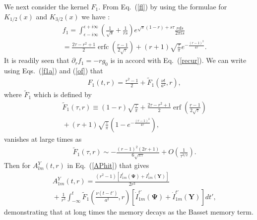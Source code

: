 \documentclass[aps,prx,twocolumn,amsmath,amssymb,amsfonts]{revtex4-2}
\DeclareMathOperator\erfc{erfc}
\DeclareMathOperator\erf{erf}
\begin{document}
We next consider the kernel $F_1$. From Eq.~(\ref{fl}) by using the formulae for $K_{1/2}(x)$ and $K_{3/2}(x)$ we have \cite{prud}:
\begin{eqnarray}&&\!\!\!
f_1\!=\! \int_{\epsilon-i\infty}^{\epsilon+i\infty}\! \left(\frac{1}{\sqrt{s}}+\frac{1}{rs}\right) e^{\sqrt{s}(1\!-\!r)\!+\!s\tau} \frac{rds}{2\pi i  s}\, \label{f1a}\\&&\!\!\!
=\!\frac{2\tau\!-\!r^2\!+\!1}{2}\erfc\left(\frac{r\!-\!1}{2\sqrt{\tau}}\right)\!+\!(r\!+\!1)\sqrt{\frac{\tau}{\pi}}e^{-\frac{(r\!-\!1)^2}{4\tau}}. \nonumber
\end{eqnarray}
It is readily seen that $\partial_r f_1=-rg_0$ is in accord with Eq.~(\ref{recur}).
We can write using Eqs.~(\ref{f1a}) and (\ref{of}) that
\begin{eqnarray}&&\!\!\!\!\!\!\!
F_1(t, r)=\frac{r^2\!-\!1}{2}+{\tilde F}_1\left(\frac{\nu t}{a^2}, r\right), \label{f11}
\end{eqnarray}
where ${\tilde F}_1$ which is defined by
\begin{eqnarray}&&\!\!\!\!\!\!\!
{\tilde F}_1\left(\tau, r\right)\equiv (1\!-\!r)\sqrt{\frac{\tau}{\pi}}\!+\!\frac{2\tau\!-\!r^2\!+\!1}{2}\erf\left(\frac{r\!-\!1}{2\sqrt{\tau}}\right)\nonumber\\&&\!\!\!\!\!\!\!+(r\!+\!1)
\sqrt{\frac{\tau}{\pi}}\left(1-e^{-\frac{(r\!-\!1)^2}{4\tau}}\right), \label{asll}
\end{eqnarray}
vanishes at large times as
\begin{eqnarray}&&\!\!\!\!\!\!\!
{\tilde F}_1\left(\tau, r\right)\sim -\frac{(r\!-\!1)^2(2r\!+\!1)}{6\sqrt{\pi \tau}}+O\left(\frac{1}{\tau^{3/2}}\right).\label{f12}
\end{eqnarray}
Then for $A_{lm}^{Y}(t, r)$ in Eq.~(\ref{APhit}) that gives
\begin{eqnarray}&&
A_{1m}^{Y}(t, r)\! = \!\frac{(r^2\!-\!1)[I_{1m}^{t}(\bm \Psi) \!+\!  I_{1m}^{t}(\bm Y)]}{2r^3}
\label{alma}\\&&\!\!\!\!\!\!\!
+\frac{1}{r^3}\int_{-\infty}^t\! {\tilde F}_1\left(\frac{\nu(t\!-\!t')}{a^2}, r\right) [\dot{I}_{1m}^{t'}(\bm \Psi) \!+\!  \dot{I}_{1m}^{t'}(\bm Y)]dt',\nonumber
\end{eqnarray}
demonstrating that at long times the memory decays as the Basset memory term.
\end{document}
